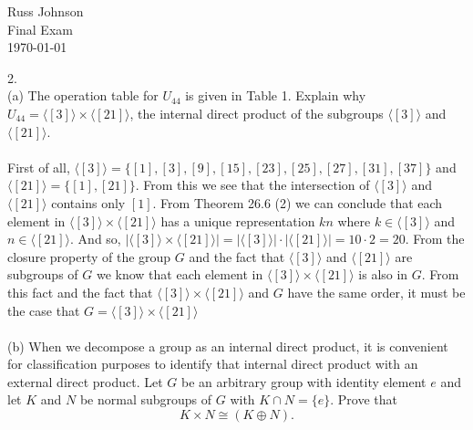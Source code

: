 \documentclass[11pt]{article}
\begin{document}
\begin{flushright}
Russ Johnson\\
Final Exam\\
\today\\
\end{flushright}

2.\\
(a) The operation table for $U_{44}$ is given in Table 1. Explain why $U_{44}=\langle [3] \rangle \times \langle [21] \rangle$, the internal direct product of the subgroups $\langle [3] \rangle$ and $\langle [21] \rangle$.\\
~\\
First of all, $\langle [3] \rangle = \{[1],[3],[9],[15],[23],[25],[27],[31],[37]\}$ and $\langle [21] \rangle = \{[1],[21]\}$. 
From this we see that the intersection of $\langle [3] \rangle$ and $\langle [21] \rangle$ contains only $[1]$. 
From Theorem 26.6 (2) we can conclude that each element in $\langle [3] \rangle \times \langle [21] \rangle$ has a unique representation $kn$ 
where $k\in \langle [3] \rangle$ and $n\in \langle [21] \rangle$. And so, 
$ |\langle [3] \rangle \times \langle [21] \rangle| = |\langle [3] \rangle|\cdot |\langle [21] \rangle | = 10\cdot 2 = 20. $ 
From the closure property of the group $G$ and the fact that $\langle [3] \rangle $ and $ \langle [21] \rangle$ are subgroups of $G$ we know that each element in $ \langle [3] \rangle \times \langle [21] \rangle $ is also in $G$. From this fact and the fact that $ \langle [3] \rangle \times \langle [21] \rangle $ and $G$ have the same order, it must be the case that $ G= \langle [3] \rangle \times \langle [21] \rangle $\\
~\\
(b) When we decompose a group as an internal direct product, it is convenient for classification purposes to identify that internal direct product with an external direct product. Let $G$ be an arbitrary group with identity element $e$ and let $K$ and $N$ be normal subgroups of $G$ with $K \cap N = \{e\}$. Prove that 
\[ K \times N \cong (K \oplus N).\]
\newcommand{\dom}{\ensuremath{K \oplus N}}
\newcommand{\img}{\ensuremath{K \times N}}
\end{document}
